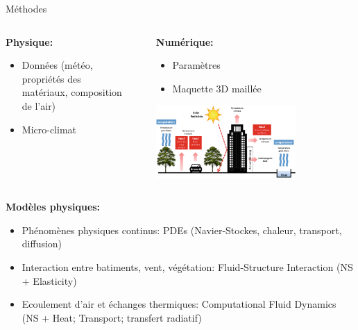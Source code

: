 \documentclass{beamer}
\begin{document}
\begin{frame}{Méthodes}
    \small
    \begin{columns}[T]
        \begin{column}{0.45\textwidth}
            \textbf{Physique:} \\
            \begin{itemize}
                \item Données (météo, propriétés des matériaux, composition de l'air)
                \item Micro-climat
            \end{itemize}
        \end{column}
        \begin{column}{0.1\textwidth}
            \begin{center}
            \end{center}
        \end{column}
        \begin{column}{0.45\textwidth}
            \textbf{Numérique:}
            \begin{itemize}
                \item Paramètres
                \item Maquette 3D maillée
            \end{itemize}
            \vspace{0.3cm}
            \includegraphics[width=0.7\textwidth]{images/micro-climat_scheme.png} \\
        \end{column}
    \end{columns}

    \vspace{-0.4cm}
    \textbf{Modèles physiques:}
    \begin{itemize}
        \item Phénomènes physiques continus: PDEs (Navier-Stockes, chaleur, transport, diffusion)
        \item Interaction entre batiments, vent, végétation: Fluid-Structure Interaction (NS + Elasticity)
        \item Ecoulement d'air et échanges thermiques: Computational Fluid Dynamics (NS + Heat; Transport; transfert radiatif) %
    \end{itemize}
\end{frame}
\end{document}
